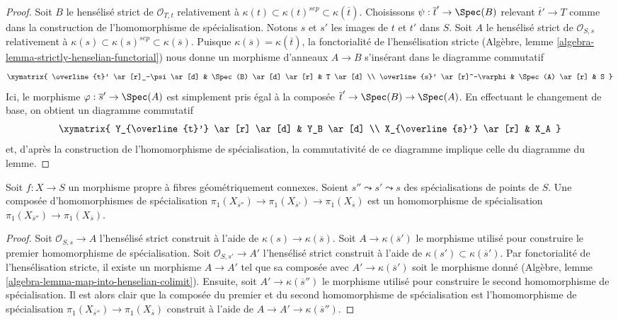 \begin{proof}
Soit $B$ le hensélisé strict de $\mathcal{O}_{T, t}$ relativement à
$\kappa(t) \subset \kappa(t)^{sep} \subset \kappa(\overline{t})$.
Choisissons $\psi : \overline{t}' \to \Spec(B)$ relevant $\overline{t}' \to T$
comme dans la construction de l'homomorphisme de spécialisation.
Notons $s$ et $s'$ les images de $t$ et $t'$ dans $S$.
Soit $A$ le hensélisé strict de $\mathcal{O}_{S, s}$
relativement à
$\kappa(s) \subset \kappa(s)^{sep} \subset \kappa(\overline{s})$.
Puisque $\kappa(\overline{s}) = \kappa(\overline{t})$,
la fonctorialité de l'hensélisation stricte
(Algèbre, lemme \ref{algebra-lemma-strictly-henselian-functorial})
nous donne un morphisme d'anneaux $A \to B$ s'insérant dans le diagramme commutatif
$$
\xymatrix{
\overline{t}' \ar[r]_-\psi \ar[d] & \Spec(B) \ar[d] \ar[r] & T \ar[d] \\
\overline{s}' \ar[r]^-\varphi & \Spec(A) \ar[r] & S
}
$$
Ici, le morphisme $\varphi : \overline{s}' \to \Spec(A)$ est simplement pris
égal à la composée $\overline{t}' \to \Spec(B) \to \Spec(A)$.
En effectuant le changement de base, on obtient un diagramme commutatif
$$
\xymatrix{
Y_{\overline{t}'} \ar[r] \ar[d] & Y_B \ar[d] \\
X_{\overline{s}'} \ar[r] & X_A
}
$$
et, d'après la construction de l'homomorphisme de spécialisation, la commutativité
de ce diagramme implique celle du diagramme du lemme.
\end{proof}

\begin{lemma}
\label{lemma-specialization-map-composition}
Soit $f : X \to S$ un morphisme propre à fibres géométriquement connexes.
Soient $s'' \leadsto s' \leadsto s$ des spécialisations de points de $S$.
Une composée d'homomorphismes de spécialisation
$\pi_1(X_{\overline{s}''}) \to \pi_1(X_{\overline{s}'}) \to
\pi_1(X_{\overline{s}})$ est un homomorphisme de spécialisation
$\pi_1(X_{\overline{s}''}) \to \pi_1(X_{\overline{s}})$.
\end{lemma}

\begin{proof}
Soit $\mathcal{O}_{S, s} \to A$ l'hensélisé strict
construit à l'aide de $\kappa(s) \to \kappa(\overline{s})$.
Soit $A \to \kappa(\overline{s}')$ le morphisme utilisé pour construire
le premier homomorphisme de spécialisation. Soit $\mathcal{O}_{S, s'} \to A'$
l'hensélisé strict construit à l'aide de
$\kappa(s') \subset \kappa(\overline{s}')$.
Par fonctorialité de l'hensélisation stricte, il existe un morphisme
$A \to A'$ tel que sa composée avec $A' \to \kappa(\overline{s}')$
soit le morphisme donné
(Algèbre, lemme \ref{algebra-lemma-map-into-henselian-colimit}).
Ensuite, soit $A' \to \kappa(\overline{s}'')$ le morphisme utilisé pour
construire le second homomorphisme de spécialisation. Il est alors clair que
la composée du premier et du second homomorphisme de spécialisation
est l'homomorphisme de spécialisation
$\pi_1(X_{\overline{s}''}) \to \pi_1(X_{\overline{s}})$
construit à l'aide de $A \to A' \to \kappa(\overline{s}'')$.
\end{proof}

